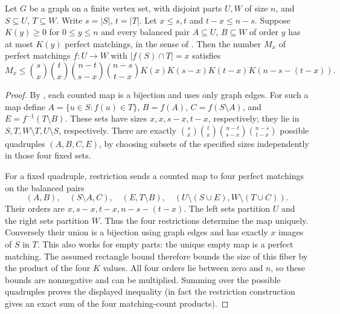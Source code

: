 \begin{lemma}
Let $G$ be a graph on a finite vertex set, with disjoint parts $U,W$ of
size $n$, and $S\subseteq U$, $T\subseteq W$. Write $s=|S|$, $t=|T|$.
Let $x\le s,t$ and $t-x\le n-s$. Suppose $K(y)\ge0$ for $0\le y\le n$
and every balanced pair $A\subseteq U$, $B\subseteq W$ of order $y$ has
at most $K(y)$ perfect matchings, in the sense of
. Then the number $M_x$ of perfect matchings
$f:U\to W$ with $|f(S)\cap T|=x$ satisfies
\[
 M_x\le\binom s x\binom t x\binom{n-t}{s-x}\binom{n-s}{t-x}
 K(x)K(s-x)K(t-x)K(n-s-(t-x)).
\]
\end{lemma}
\begin{proof}
By , each counted map is a bijection and uses
only graph edges. For such a map define
$A=\{u\in S:f(u)\in T\}$, $B=f(A)$,
$C=f(S\setminus A)$, and $E=f^{-1}(T\setminus B)$.
These sets have sizes $x,x,s-x,t-x$, respectively; they lie in
$S,T,W\setminus T,U\setminus S$, respectively. There are exactly
$\binom s x\binom t x\binom{n-t}{s-x}\binom{n-s}{t-x}$ possible
quadruples $(A,B,C,E)$, by choosing subsets of the specified sizes
independently in those four fixed sets.

For a fixed quadruple, restriction sends a counted map to four perfect
matchings on the balanced pairs
\[
 (A,B),\quad (S\setminus A,C),\quad(E,T\setminus B),\quad
 (U\setminus(S\cup E),W\setminus(T\cup C)).
\]
Their orders are $x,s-x,t-x,n-s-(t-x)$. The left sets partition $U$
and the right sets partition $W$. Thus the four restrictions determine
the map uniquely. Conversely their union is a bijection using graph
edges and has exactly $x$ images of $S$ in $T$. This also works for empty
parts: the unique empty map is a perfect matching. The assumed rectangle
bound therefore bounds the size of this fiber by the product of the four
$K$ values. All four orders lie between zero and $n$, so these bounds are
nonnegative and can be multiplied. Summing over the possible quadruples
proves the displayed inequality (in fact the restriction construction
gives an exact sum of the four matching-count products).
\end{proof}
